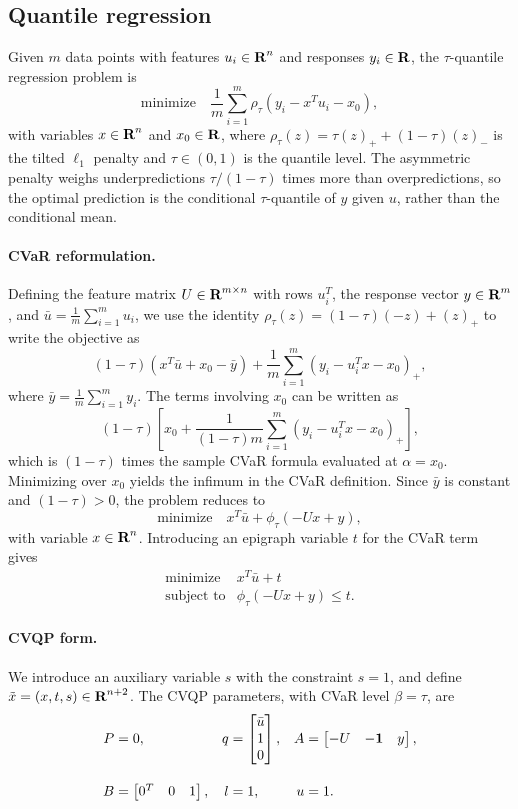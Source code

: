 \documentclass[12pt]{article}
\begin{document}
\subsection{Quantile regression}
Given $m$ data points with features $u_i \in {\mbox{\bf R}}^n$ and responses
$y_i \in {\mbox{\bf R}}$, the $\tau$-quantile regression problem is
\[
\mbox{minimize} \quad \frac{1}{m}\sum_{i=1}^m \rho_\tau(y_i - x^T u_i - x_0),
\]
with variables $x \in {\mbox{\bf R}}^n$ and $x_0 \in {\mbox{\bf R}}$, where
$\rho_\tau(z) = \tau (z)_+ + (1-\tau)(z)_-$ is the tilted $\ell_1$ penalty
and $\tau \in (0,1)$ is the quantile level. The asymmetric penalty weighs
underpredictions $\tau/(1-\tau)$ times more than overpredictions, so the optimal
prediction is the conditional $\tau$-quantile of $y$ given $u$, rather than
the conditional mean.

\paragraph{CVaR reformulation.}
Defining the feature matrix $U \in {\mbox{\bf R}}^{m \times n}$ with rows $u_i^T$,
the response vector $y \in {\mbox{\bf R}}^m$, and $\bar{u} = \frac{1}{m}\sum_{i=1}^m u_i$,
we use the identity $\rho_\tau(z) = (1-\tau)(-z) + (z)_+$ to write the objective as
\[
(1-\tau)\left(x^T\bar{u} + x_0 - \bar{y}\right) + \frac{1}{m}\sum_{i=1}^m (y_i - u_i^Tx - x_0)_+,
\]
where $\bar{y} = \frac{1}{m}\sum_{i=1}^m y_i$. The terms involving $x_0$ can be written as
\[
(1-\tau)\left[x_0 + \frac{1}{(1-\tau)m}\sum_{i=1}^m(y_i - u_i^Tx - x_0)_+\right],
\]
which is $(1-\tau)$ times the sample CVaR formula evaluated at $\alpha = x_0$.
Minimizing over $x_0$ yields the infimum in the CVaR definition.
Since $\bar{y}$ is constant and $(1-\tau) > 0$, the problem reduces to
\[
\mbox{minimize} \quad x^T \bar{u} + \phi_\tau(-Ux + y),
\]
with variable $x \in {\mbox{\bf R}}^n$. Introducing an epigraph variable $t$ for the
CVaR term gives
\[
\begin{array}{ll}
\mbox{minimize}   & x^T \bar{u} + t \\
\mbox{subject to} & \phi_\tau(-Ux + y) \leq t.
\end{array}
\]

\paragraph{CVQP form.}
We introduce an auxiliary variable $s$ with the constraint $s=1$, and define
$\tilde{x} = (x, t, s) \in {\mbox{\bf R}}^{n+2}$. The CVQP parameters, with CVaR
level $\beta = \tau$, are
\[
\begin{aligned}
P &= 0, & q &= \begin{bmatrix} \bar{u} \\ 1 \\ 0 \end{bmatrix}, & A &= \begin{bmatrix} -U & -\mathbf 1 & y \end{bmatrix}, \\[1em]
B &= \begin{bmatrix} 0^T & 0 & 1 \end{bmatrix}, &
l &= 1, &
u &= 1.
\end{aligned}
\]
\end{document}
